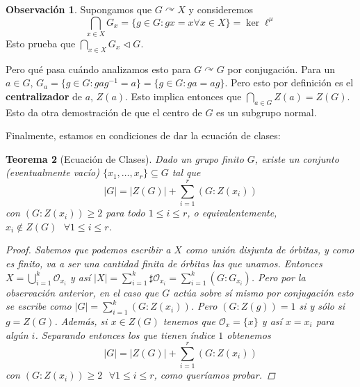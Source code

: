 \documentclass[12pt]{book}
\newtheorem{teo}{Teorema}[section]
\theoremstyle{definition}
\newtheorem{obs}[teo]{Observación}
\def\acts{\curvearrowright}
\begin{document}
\begin{obs}
Supongamos que $G\acts X$ y consideremos $$\displaystyle\bigcap_{x\in X}G_x = \{g\in G : gx = x \forall x \in X\} = \ker \ell^{\mu}$$ Esto prueba que $\displaystyle\bigcap_{x\in X} G_x \triangleleft G$.

Pero qué pasa cuándo analizamos esto para $G\acts G$ por conjugación. Para un $a\in G$, $G_a = \{g\in G : gag^{-1}=a\} = \{g\in G: ga=ag\}$. Pero esto por definición es el \textbf{centralizador} de $a$, $Z(a)$.
Esto implica entonces que $\displaystyle\bigcap_{a\in G} Z(a) = Z(G)$. Esto da otra demostración de que el centro de $G$ es un subgrupo normal.
\end{obs}
Finalmente, estamos en condiciones de dar la ecuación de clases:
\begin{teo}[Ecuación de Clases]
Dado un grupo finito $G$, existe un conjunto (eventualmente vacío) $\{x_1,\ldots , x_r\}\subseteq G$ tal que $$|G| = |Z(G)| + \displaystyle\sum_{i=1}^{r}(G:Z(x_i))$$ con $(G:Z(x_i))\geq 2$ para todo $1\leq i\leq r$, o equivalentemente, $x_i\notin Z(G) \text{ } \forall 1\leq i\leq r$.
\begin{proof}
Sabemos que podemos escribir a $X$ como unión disjunta de órbitas, y como es finito, va a ser una cantidad finita de órbitas las que unamos. Entonces $X = \displaystyle\bigcup_{i=1}^{k} \mathcal{O}_{x_i}$ y así $|X| = \displaystyle\sum_{i=1}^{k}\sharp \mathcal{O}_{x_i} = \displaystyle\sum_{i=1}^{k} (G:G_{x_i})$. Pero por la observación anterior, en el caso que $G$ actúa sobre sí mismo por conjugación esto se escribe como $|G| = \displaystyle\sum_{i=1}^{k}(G:Z(x_i))$. Pero $(G:Z(g))=1$ si y sólo si $g=Z(G)$. Además, si $x\in Z(G)$ tenemos que $\mathcal{O}_x=\{x\}$ y así $x=x_i$ para algún $i$. Separando entonces los que tienen índice $1$ obtenemos $$|G| = |Z(G)| + \displaystyle\sum_{i=1}^{r}(G:Z(x_i))$$ con $(G:Z(x_i))\geq 2 \text{ } \forall 1\leq i\leq r$, como queríamos probar.
\end{proof}
\end{teo}
\end{document}
